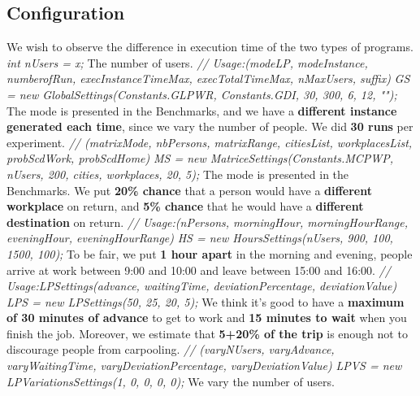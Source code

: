 \documentclass[12pt, a4paper, twoside]{memoir}
\newcommand{\newpar}{\vskip 0.2in \noindent}
\newcommand\tab[1][1cm]{\hspace*{#1}}
\begin{document}
{	\subsection{Configuration}
	We wish to observe the difference in execution time of the two types of programs.
	\newpar
	\tab \textit{int nUsers = x;}\newline
	The number of users.
	\newpar
	\tab \textit{// Usage:(modeLP, modeInstance, numberofRun, execInstanceTimeMax, execTotalTimeMax, nMaxUsers, suffix)}\newline
	\tab \textit{GS = new GlobalSettings(Constants.GLPWR, Constants.GDI, 30, 300, 6, 12, "");}\newline
	The mode is presented in the Benchmarks, and we have a \textbf{different instance generated each time}, since we vary the number of people. We did \textbf{30 runs} per experiment.
	\newpar
	\tab \textit{// (matrixMode, nbPersons, matrixRange, citiesList, workplacesList, probScdWork, probScdHome)}\newline
	\tab \textit{MS = new MatriceSettings(Constants.MCPWP, nUsers, 200, cities, workplaces, 20, 5);}\newline
	The mode is presented in the Benchmarks. We put \textbf{20\% chance} that a person would have a \textbf{different workplace} on return, and \textbf{5\% chance} that he would have a \textbf{different destination} on return.
	\newpar
	\tab \textit{// Usage:(nPersons, morningHour, morningHourRange, eveningHour, eveningHourRange)}\newline
	\tab \textit{HS = new HoursSettings(nUsers, 900, 100, 1500, 100);}\newline
	To be fair, we put \textbf{1 hour apart} in the morning and evening, people arrive at work between 9:00 and 10:00 and leave between 15:00 and 16:00.
	\newpar
	\tab \textit{// Usage:LPSettings(advance, waitingTime, deviationPercentage, deviationValue)}\newline
	\tab \textit{LPS = new LPSettings(50, 25, 20, 5);}\newline
	We think it's good to have a \textbf{maximum of 30 minutes of advance} to get to work and \textbf{15 minutes to wait} when you finish the job. Moreover, we estimate that \textbf{5+20\% of the trip} is enough not to discourage people from carpooling.
	\newpar
	\tab \textit{// (varyNUsers, varyAdvance, varyWaitingTime, varyDeviationPercentage, varyDeviationValue)}\newline
	\tab \textit{LPVS = new LPVariationsSettings(1, 0, 0, 0, 0);}\newline
	We vary the number of users.
}
\end{document}
